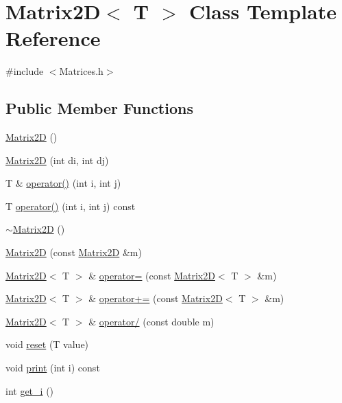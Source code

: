 \hypertarget{classMatrix2D}{}\section{Matrix2D$<$ T $>$ Class Template Reference}
\label{classMatrix2D}


{\ttfamily \#include $<$Matrices.\+h$>$}

\subsection*{Public Member Functions}
\begin{DoxyCompactItemize}
\item 
\mbox{\hyperlink{classMatrix2D_a950bb2aa76c86e057d91f430d5a27b57}{Matrix2D}} ()
\item 
\mbox{\hyperlink{classMatrix2D_ac93acc71341e612cf8b23d4308c561f8}{Matrix2D}} (int di, int dj)
\item 
T \& \mbox{\hyperlink{classMatrix2D_abcb61863666c4e17352c9fd2fc0a254a}{operator()}} (int i, int j)
\item 
T \mbox{\hyperlink{classMatrix2D_a1a14d98d090d0d1cbda97a8fa797f1c5}{operator()}} (int i, int j) const
\item 
\mbox{\hyperlink{classMatrix2D_a6b86d001220161af2136ba49fd8b26b9}{$\sim$\+Matrix2D}} ()
\item 
\mbox{\hyperlink{classMatrix2D_aa1d3642d7cea07adac1a7bd83586d292}{Matrix2D}} (const \mbox{\hyperlink{classMatrix2D}{Matrix2D}} \&m)
\item 
\mbox{\hyperlink{classMatrix2D}{Matrix2D}}$<$ T $>$ \& \mbox{\hyperlink{classMatrix2D_a17597829237784fa6089a23b7accb631}{operator=}} (const \mbox{\hyperlink{classMatrix2D}{Matrix2D}}$<$ T $>$ \&m)
\item 
\mbox{\hyperlink{classMatrix2D}{Matrix2D}}$<$ T $>$ \& \mbox{\hyperlink{classMatrix2D_a05b92232d9a5e7b76c4d4c1508ae2e12}{operator+=}} (const \mbox{\hyperlink{classMatrix2D}{Matrix2D}}$<$ T $>$ \&m)
\item 
\mbox{\hyperlink{classMatrix2D}{Matrix2D}}$<$ T $>$ \& \mbox{\hyperlink{classMatrix2D_a48122f2fa79bf511d0c4e143dcdb0cf0}{operator/}} (const double m)
\item 
void \mbox{\hyperlink{classMatrix2D_a1a646829a2e9d166e0e47439de633b95}{reset}} (T value)
\item 
void \mbox{\hyperlink{classMatrix2D_a27ccf42f23c568b2397b744ec32a41d1}{print}} (int i) const
\item 
int \mbox{\hyperlink{classMatrix2D_a9d44e60eef0274c20ed9bd1f597c89eb}{get\+\_\+i}} ()

\end{DoxyCompactItemize}
